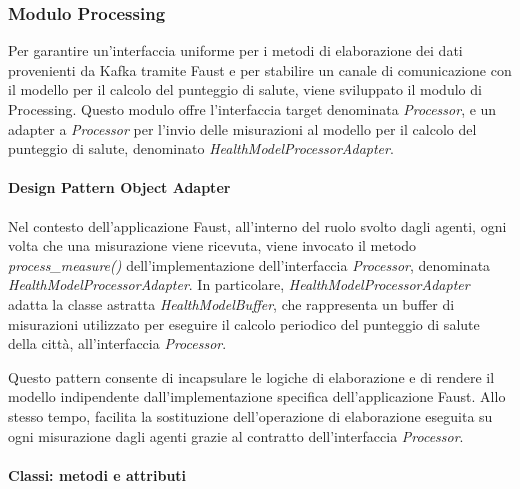 \subsubsection{Modulo Processing}
Per garantire un'interfaccia uniforme per i metodi di elaborazione dei dati provenienti da Kafka tramite Faust e per stabilire un canale di comunicazione con il modello per il calcolo del punteggio di salute, viene sviluppato il modulo di Processing. Questo modulo offre l'interfaccia target denominata \textit{Processor}, e un adapter a \textit{Processor} per l'invio delle misurazioni al modello per il calcolo del punteggio di salute, denominato \textit{HealthModelProcessorAdapter}.

\paragraph*{Design Pattern Object Adapter}
Nel contesto dell'applicazione Faust, all'interno del ruolo svolto dagli agenti, ogni volta che una misurazione viene ricevuta, viene invocato il metodo \textit{process\_measure()} dell'implementazione dell'interfaccia \textit{Processor}, denominata \textit{HealthModelProcessorAdapter}. In particolare, \textit{HealthModelProcessorAdapter} adatta la classe astratta \textit{HealthModelBuffer}, che rappresenta un buffer di misurazioni utilizzato per eseguire il calcolo periodico del punteggio di salute della città, all'interfaccia \textit{Processor}.

Questo pattern consente di incapsulare le logiche di elaborazione e di rendere il modello indipendente dall'implementazione specifica dell'applicazione Faust. Allo stesso tempo, facilita la sostituzione dell'operazione di elaborazione eseguita su ogni misurazione dagli agenti grazie al contratto dell'interfaccia \textit{Processor}.
\paragraph*{Classi: metodi e attributi}